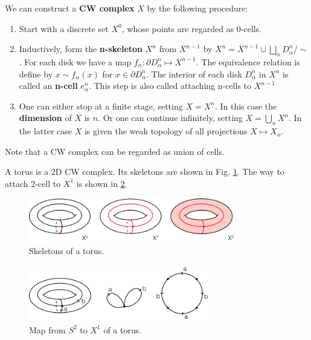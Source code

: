 \documentclass[12pt]{book}
\begin{document}
\begin{definition}
	We can construct a {\bf CW complex} $X$ by the following procedure:
	\begin{enumerate}
		\item Start with a discrete set $X^0$, whose points are regarded as 0-cells.
		\item Inductively, form the {\bf n-skeleton} $X^n$ from $X^{n-1}$ by $X^n=X^{n-1}\sqcup\bigsqcup_\alpha D_\alpha^n/\sim$. For each disk we have a map $f_\alpha:\partial D_\alpha^n\mapsto X^{n-1}$. The equivalence relation is define by $x\sim f_\alpha(x)$ for $x\in\partial D_\alpha^n$. The interior of each disk $D_\alpha^n$ in $X^n$ is called an {\bf n-cell} $e^n_\alpha$. This step is also called attaching n-cells to $X^{n-1}$
		\item One can either stop at a finite stage, setting $X=X^n$. In this case the {\bf dimension} of $X$ is $n$. Or one can continue infinitely, setting $X=\bigcup_n X^n$. In the latter case $X$ is given the weak topology of all projections $X\mapsto X_n$.
	\end{enumerate}
\end{definition}

Note that a CW complex can be regarded as union of cells.

\begin{example}
	A torus is a 2D CW complex. Its skeletons are shown in Fig. \ref{fig:torus_skeleton}. The way to attach 2-cell to $X^1$ is shown in \ref{fig:torus_map}.
\end{example}
\begin{figure}[htb!]
	\centering  
	\includegraphics[width=0.8\textwidth ]{resources/chap_misc/torus_skeleton.pdf}  
	\caption{Skeletons of a torus.}
	\label{fig:torus_skeleton}
\end{figure}
\begin{figure}[htb!]
	\centering  
	\includegraphics[width=0.7\textwidth ]{resources/chap_misc/torus_map.pdf}  
	\caption{Map from $S^2$ to $X^1$ of a torus.}
	\label{fig:torus_map}
\end{figure}
\end{document}
